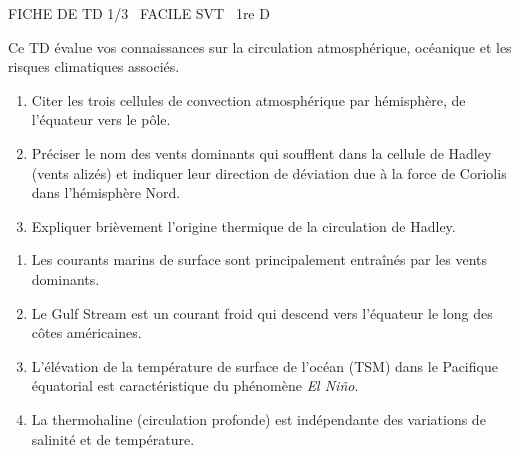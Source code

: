 \documentclass[11pt]{article}
\begin{document}
\begin{tcolorbox}[enhanced,colback=popink,colframe=popink,arc=10pt,boxrule=0pt,left=12pt,right=12pt,top=9pt,bottom=9pt]
{\color{white}\popxbold\small FICHE DE TD 1/3 \textbullet\ FACILE \hfill SVT \textbullet\ 1re D\par}
\end{tcolorbox}
\vspace{4pt}
Ce TD évalue vos connaissances sur la circulation atmosphérique, océanique et les risques climatiques associés.

\begin{exercice}
\begin{enumerate}
    \item Citer les trois cellules de convection atmosphérique par hémisphère, de l'équateur vers le pôle.
    \item Préciser le nom des vents dominants qui soufflent dans la cellule de Hadley (vents alizés) et indiquer leur direction de déviation due à la force de Coriolis dans l'hémisphère Nord.
    \item Expliquer brièvement l'origine thermique de la circulation de Hadley.
\end{enumerate}
\end{exercice}

\begin{exercice}
\begin{enumerate}
    \item Les courants marins de surface sont principalement entraînés par les vents dominants.
    \item Le Gulf Stream est un courant froid qui descend vers l'équateur le long des côtes américaines.
    \item L'élévation de la température de surface de l'océan (TSM) dans le Pacifique équatorial est caractéristique du phénomène \textit{El Niño}.
    \item La thermohaline (circulation profonde) est indépendante des variations de salinité et de température.
\end{enumerate}
\end{exercice}
\end{document}
